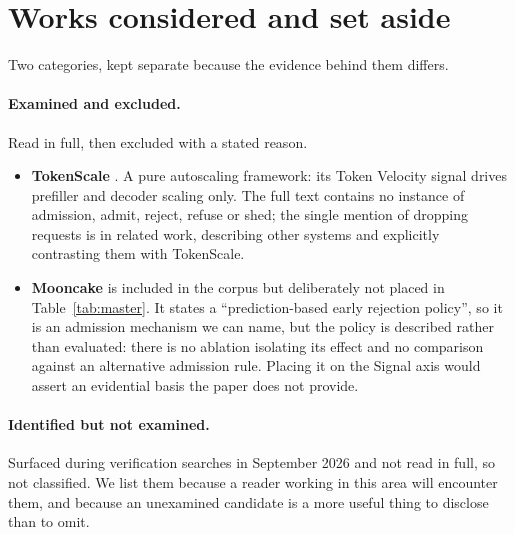 \appendix
\section{Works considered and set aside}
\label{sec:excluded}

Two categories, kept separate because the evidence behind them differs.

\paragraph{Examined and excluded.} Read in full, then excluded with a
stated reason.

\begin{itemize}[leftmargin=1.5em, itemsep=2pt]
\item \textbf{TokenScale} \citep{lai2025tokenscale}. A pure autoscaling
      framework: its Token Velocity signal drives prefiller and decoder
      scaling only. The full text contains no instance of admission,
      admit, reject, refuse or shed; the single mention of dropping
      requests is in related work, describing other systems and
      explicitly contrasting them with TokenScale.
\item \textbf{Mooncake} \citep{qin2025mooncake} is included in the
      corpus but deliberately not placed in
      Table~\ref{tab:master}. It states a ``prediction-based early
      rejection policy'', so it is an admission mechanism we can name,
      but the policy is described rather than evaluated: there is no
      ablation isolating its effect and no comparison against an
      alternative admission rule. Placing it on the Signal axis would
      assert an evidential basis the paper does not provide.
\end{itemize}

\paragraph{Identified but not examined.} Surfaced during verification
searches in September 2026 and not read in full, so not classified. We
list them because a reader working in this area will encounter them,
and because an unexamined candidate is a more useful thing to disclose
than to omit.

